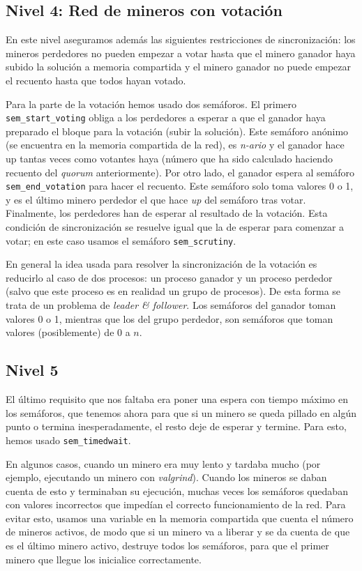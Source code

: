 \documentclass{article}
\begin{document}
\subsection*{Nivel 4: Red de mineros con votación}

En este nivel aseguramos además las siguientes restricciones de sincronización: los mineros perdedores no pueden empezar a votar hasta que el minero ganador haya subido la solución a memoria compartida y el minero ganador no puede empezar el recuento hasta que todos hayan votado.

Para la parte de la votación hemos usado dos semáforos. El primero \texttt{sem\_start\_voting} obliga a los perdedores a esperar a que el ganador haya preparado el bloque para la votación (subir la solución). Este semáforo anónimo (se encuentra en la memoria compartida de la red), es \textit{n-ario} y el ganador hace up tantas veces como votantes haya (número que ha sido calculado haciendo  recuento del \textit{quorum} anteriormente). Por otro lado, el ganador espera al semáforo \texttt{sem\_end\_votation} para hacer el recuento. Este semáforo solo toma valores 0 o 1, y es el último minero perdedor el que hace \emph{up} del semáforo tras votar. Finalmente, los perdedores han de esperar al resultado de la votación. Esta condición de sincronización se resuelve igual que la de esperar para comenzar a votar; en este caso usamos el semáforo \texttt{sem\_scrutiny}.

En general la idea usada para resolver la sincronización de la votación es reducirlo al caso de dos procesos: un proceso ganador y un proceso perdedor (salvo que este proceso es en realidad un grupo de procesos). De esta forma se trata de un problema de \textit{leader \& follower}. Los semáforos del ganador toman valores 0 o 1, mientras que los del grupo perdedor, son semáforos que toman valores (posiblemente) de 0 a $n$.




\subsection*{Nivel 5}

El último requisito que nos faltaba era poner una espera con tiempo máximo en los semáforos, que tenemos ahora para que si un minero se queda pillado en algún punto o termina inesperadamente, el resto deje de esperar y termine. Para esto, hemos usado \texttt{sem\_timedwait}. 

En algunos casos, cuando un minero era muy lento y tardaba mucho (por ejemplo, ejecutando un minero con \textit{valgrind}). Cuando los mineros se daban cuenta de esto y terminaban su ejecución, muchas veces los semáforos quedaban con valores incorrectos que impedían el correcto funcionamiento de la red. Para evitar esto, usamos una variable en la memoria compartida que cuenta el número de mineros activos, de modo que si un minero va a liberar y se da cuenta de que es el último minero activo, destruye todos los semáforos, para que el primer minero que llegue los inicialice correctamente.
\end{document}
